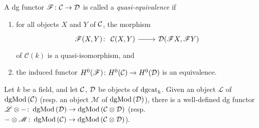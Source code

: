 \documentclass[dissertation.tex]{subfiles}
\begin{document}
\begin{defn}
  A dg functor $\mathscr{F} \colon \mathcal{C} \rightarrow \mathcal{D}$ is called a {\it quasi-equivalence} if 
  \begin{enumerate}
  \item
    for all objects $X$ and $Y$ of $\mathcal{C}$, the morphism
    $$\mathscr{F}(X,Y) \colon
    \begin{tikzcd}
      \C(X,Y) \arrow{r} & \D(\mathscr{F}X,\mathscr{F}Y)
    \end{tikzcd}$$
    of $\mathcal{C}(k)$ is a quasi-isomorphism, and
  \item
    the induced functor $H^0(\mathscr{F}) \colon H^0(\mathcal{C}) \rightarrow H^0(\mathcal{D})$ is an equivalence.
  \end{enumerate}
\end{defn}

\begin{lem}
  Let $k$ be a field, and let $\mathcal{C}$, $\mathcal{D}$ be objects of $\operatorname{dgcat}_k$.
  Given an object $\mathscr{L}$ of $\operatorname{dgMod\left(\mathcal{C}\right)}$ (resp. an object $\mathscr{M}$ of $\operatorname{dgMod\left(\mathcal{D}\right)}$), there is a well-defined dg functor $\mathscr{L} \otimes - \colon \operatorname{dgMod\left(\mathcal{D}\right)} \to \operatorname{dgMod\left(\mathcal{C} \otimes \mathcal{D}\right)}$ (resp. $- \otimes \mathscr{M} \colon \operatorname{dgMod\left(\mathcal{C}\right)} \to \operatorname{dgMod\left(\mathcal{C} \otimes \mathcal{D}\right)}$).
  


\end{lem}
\end{document}
